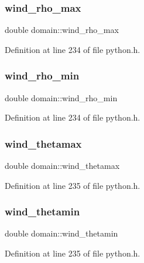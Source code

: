 \subsubsection{\texorpdfstring{wind\+\_\+rho\+\_\+max}{wind\_rho\_max}}
{\footnotesize\ttfamily double domain\+::wind\+\_\+rho\+\_\+max}



Definition at line 234 of file python.\+h.

\mbox{\label{structdomain_a88c4870706becdf39db62514c4dfbad6}} 
\subsubsection{\texorpdfstring{wind\+\_\+rho\+\_\+min}{wind\_rho\_min}}
{\footnotesize\ttfamily double domain\+::wind\+\_\+rho\+\_\+min}



Definition at line 234 of file python.\+h.

\mbox{\label{structdomain_a8b495b7bb1917b887fde8948a209783e}} 
\subsubsection{\texorpdfstring{wind\+\_\+thetamax}{wind\_thetamax}}
{\footnotesize\ttfamily double domain\+::wind\+\_\+thetamax}



Definition at line 235 of file python.\+h.

\mbox{\label{structdomain_a30a24da6d674f0b4383730b201d206a7}} 
\subsubsection{\texorpdfstring{wind\+\_\+thetamin}{wind\_thetamin}}
{\footnotesize\ttfamily double domain\+::wind\+\_\+thetamin}



Definition at line 235 of file python.\+h.

